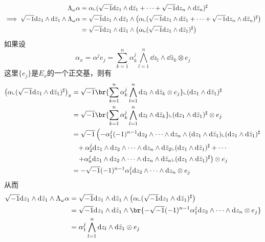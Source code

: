 \begin{align*}
  \Lambda_\omega \alpha &=\alpha\llcorner (\sqrt{-1} \dd z_1\wedge\dd \bar{z}_1+\cdots+\sqrt{-1} \dd z_n\wedge\dd \bar{z}_n)^\sharp \\ 
\implies \sqrt{-1} \dd z_1\wedge\dd \bar{z}_1\wedge \Lambda_\omega \alpha &=\sqrt{-1} \dd z_1\wedge\dd \bar{z}_1\wedge \left(\alpha\llcorner (\sqrt{-1} \dd z_1\wedge\dd \bar{z}_1+\cdots+\sqrt{-1} \dd z_n\wedge\dd \bar{z}_n)^\sharp\right)\\ 
&=\sqrt{-1} \dd z_1\wedge\dd \bar{z}_1\wedge \left(\alpha\llcorner (\sqrt{-1} \dd z_1\wedge\dd \bar{z}_1)^\sharp\right)
\end{align*}
  如果设 
  \[
    \alpha_x=\alpha^j e_j=\sum_{k=1}^{n} \alpha_k^j \bigwedge_{l=1}^n \dd z_l\wedge \dd \bar{z}_k\otimes e_j
  \]
  这里$\{e_j\}$是$E_x$的一个正交基，则有
  \begin{align*}
    \left(\alpha\llcorner (\xu \dd z_1\wedge\dd \bar{z}_1)^\sharp\right)_x &=\xu \br{\sum_{k=1}^{n} \alpha_k^j \bigwedge_{l=1}^n \dd z_l\wedge \dd \bar{z}_k\otimes e_j} \llcorner (\dd z_1\wedge\dd \bar{z}_1)^\sharp\\ 
&=\xu \br{\sum_{k=1}^{n} \alpha_k^j \bigwedge_{l=1}^n \dd z_l\wedge \dd \bar{z}_k} \llcorner (\dd z_1\wedge\dd \bar{z}_1)^\sharp \otimes e_j\\ 
&=\xu \left(-\alpha_1^j (-1)^{n-1}\dd z_2\wedge \cdots\wedge\dd z_n\wedge (\dd z_1\wedge\dd \bar{z}_1)\llcorner (\dd z_1\wedge\dd \bar{z}_1)^\sharp \right.\\
&\phantom{=}+\alpha_2^j \dd z_1\wedge\dd z_2\wedge \cdots\wedge\dd z_n\wedge\dd \bar{z}_2\llcorner (\dd z_1\wedge\dd \bar{z}_1)^\sharp+\cdots\\
&\phantom{=}\left.+\alpha_n^j \dd z_1\wedge\dd z_2\wedge \cdots\wedge\dd z_n\wedge\dd \bar{z}_n\llcorner (\dd z_1\wedge\dd \bar{z}_1)^\sharp\right)\otimes e_j\\ 
&=-\xu (-1)^{n-1}\alpha_1^j \dd z_2\wedge \cdots\wedge\dd z_n \otimes e_j
  \end{align*}
    从而
    \begin{align*}
      \xu \dd z_1\wedge\dd \bar{z}_1\wedge \Lambda_\omega \alpha 
&=\xu \dd z_1\wedge\dd \bar{z}_1\wedge \left(\alpha\llcorner (\xu \dd z_1\wedge\dd \bar{z}_1)^\sharp\right)\\ 
&=\xu \dd z_1\wedge \dd \bar{z}_1\wedge \br{-\xu (-1)^{n-1}\alpha_1^j \dd z_2\wedge \cdots\wedge\dd z_n \otimes e_j}\\ 
&=\alpha_1^j\bigwedge_{l=1}^n \dd z_l \wedge\dd \bar{z}_1\otimes e_j
    \end{align*}
      
